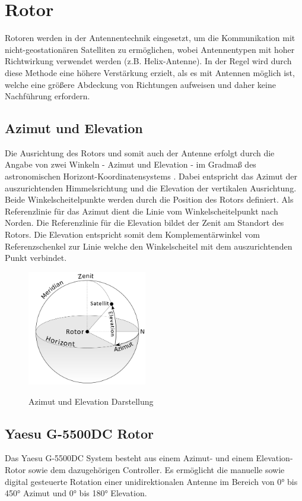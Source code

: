\chapter{Rotor}
Rotoren werden in der Antennentechnik eingesetzt, um die Kommunikation mit nicht-geostationären Satelliten zu ermöglichen, wobei Antennentypen mit hoher Richtwirkung verwendet werden (z.B. Helix-Antenne). In der Regel wird durch diese Methode eine höhere Verstärkung erzielt, als es mit Antennen möglich ist, welche eine größere Abdeckung von Richtungen aufweisen und daher keine Nachführung erfordern. 
\section{Azimut und Elevation}
Die Ausrichtung des Rotors und somit auch der Antenne erfolgt durch die Angabe von zwei Winkeln - Azimut und Elevation - im Gradmaß des astronomischen Horizont-Koordinatensystems \cite{noauthor_astronomische_nodate}. Dabei entspricht das Azimut der auszurichtenden Himmelsrichtung und die Elevation der vertikalen Ausrichtung. Beide Winkelscheitelpunkte werden durch die Position des Rotors definiert. Als Referenzlinie für das Azimut dient die Linie vom Winkelscheitelpunkt nach Norden. Die Referenzlinie für die Elevation bildet der Zenit am Standort des Rotors. Die Elevation entspricht somit dem Komplementärwinkel vom Referenzschenkel zur Linie welche den Winkelscheitel mit dem auszurichtenden Punkt verbindet.

\begin{figure}[H]
	\cite{twcarlson_azimuth_2020}
	\centering
	\includegraphics[width=5.2cm]{../ref/Azimuth-Altitude_schematic_satellit.png}
	\label{fig:Azimut_Elevation_Schematic}
	\caption{Azimut und Elevation Darstellung}
\end{figure}

\section{Yaesu G-5500DC Rotor}
Das Yaesu G-5500DC System \cite{noauthor_yaesu_nodate} besteht aus einem Azimut- und einem Elevation-Rotor sowie dem dazugehörigen Controller. Es ermöglicht die manuelle sowie digital gesteuerte Rotation einer unidirektionalen Antenne im Bereich von 0° bis 450° Azimut und 0° bis 180° Elevation.

